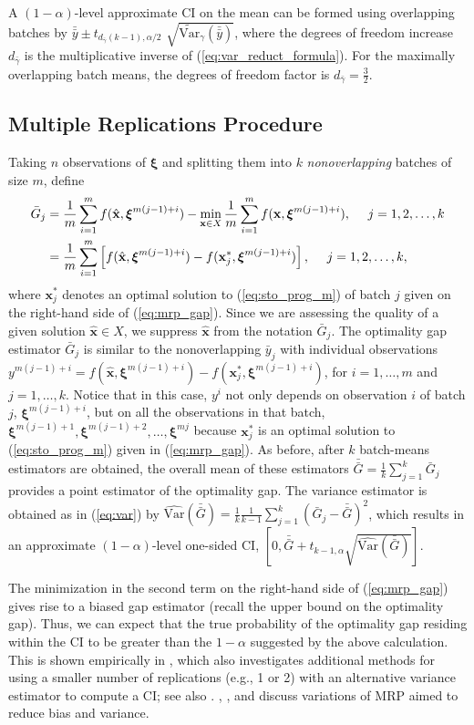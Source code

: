 \documentclass[12pt]{article}
\newcommand{\vartg}[1]{\widetilde{\mathrm{Var}}_\gamma \left( #1 \right)}
\newcommand{\varhat}{\widehat{\mathrm{Var}}}
\newcommand{\X}{X}
\newcommand{\x}{\mathbf{x}}
\newcommand{\xh}{{\hat{\x}}}
\newcommand{\xs}{\x^*}
\newcommand{\xit}{\boldsymbol{\xi}}
\newcommand{\gammab}{\bar{\gamma}}
\newcommand{\gb}{\bar{G}}
\newcommand{\gbb}{\bar{\gb}}
\newcommand{\yb}{\bar{y}}
\newcommand{\ybb}{\bar{\yb}}
\begin{document}
A $(1-\alpha)$-level approximate CI on the mean can be formed using overlapping batches by $\ybb \pm t_{d_{\gammab}(k-1),\alpha/2}$ $\sqrt{\vartg{\ybb}}$, where the degrees of freedom increase $d_{\gammab}$ is the multiplicative inverse of (\ref{eq:var_reduct_formula}).  
For the maximally overlapping batch means, the degrees of freedom factor is $d_{\gammab} = \frac{3}{2}$.

 
\subsection{Multiple Replications Procedure} 
\label{ssec:mrp}

Taking $n$ observations of $\xit$ and splitting them into $k$ {\it nonoverlapping} batches of size $m$, define
\begin{align} 
	\gb_j  & = \frac{1}{m} \sum_{i = 1}^{m} f(\xh, \xit^{m(j-1)+i}) - \min_{\x \in X} \frac{1}{m} \sum_{i=1}^{m} f(\x, \xit^{m(j-1)+i}), \ \ \ \ j = 1,2, \dots, k \label{eq:mrp_gap}\\
         & = \frac{1}{m} \sum_{i = 1}^{m} \left[ f(\xh, \xit^{m(j-1)+i}) -  f(\xs_j, \xit^{m(j-1)+i}) \right], \ \ \ \ j = 1,2, \dots, k, \notag
\end{align}
where $\xs_j$ denotes an optimal solution to (\ref{eq:sto_prog_m}) of batch $j$ given on the right-hand side of (\ref{eq:mrp_gap}).    
Since we are assessing the quality of a given solution $\xh \in \X$, we suppress $\xh$ from the notation $\gb_j$.
The optimality gap estimator $\gb_j$ is similar to the nonoverlapping $\yb_j$ with individual observations $y^{m(j-1)+i} = f(\xh,\xit^{m(j-1)+i}) - f(\xs_j,\xit^{m(j-1)+i})$, for $i=1,\ldots,m$ and $j=1,\ldots, k$.
Notice that in this case, $y^i$ not only depends on observation $i$ of batch $j$, $\xit^{m(j-1)+i}$, but on all the observations in that batch,  $\xit^{m(j-1)+1},\xit^{m(j-1)+2},\ldots,\xit^{mj}$ because $\xs_j$ is an optimal solution to (\ref{eq:sto_prog_m}) given in (\ref{eq:mrp_gap}).   
As before, after $k$ batch-means estimators are obtained, the overall mean of these estimators $\gbb = \frac{1}{k} \sum_{j=1}^k \gb_j$ provides a point estimator of the optimality gap.  
The variance estimator is obtained as in (\ref{eq:var}) by $\varhat(\gbb) = \frac{1}{k} \frac{1}{k-1} \sum_{j=1}^k (\gb_j - \gbb)^2$, which results in an approximate $(1-\alpha)$-level one-sided CI, $\left[0, \gbb + t_{k-1,\alpha} \sqrt{\varhat(\gbb)} \right]$.

The minimization in the second term on the right-hand side of (\ref{eq:mrp_gap}) gives rise to a biased gap estimator (recall the upper bound on the optimality gap).  
Thus, we can expect that the true probability of the optimality gap residing within the CI to be greater than the $1 - \alpha$ suggested by the above calculation.  
This is shown empirically in \cite{Bayraksan2006}, which also investigates additional methods for using a smaller number of replications (e.g., 1 or 2) with an alternative variance estimator to compute a CI; see also \cite{stockbridge_bayraksan_13}. 
\cite{bayraksan_morton_09}, \cite{partani2006jackknife}, and \cite{partani_07} discuss variations of MRP aimed to reduce bias and variance.
\end{document}
